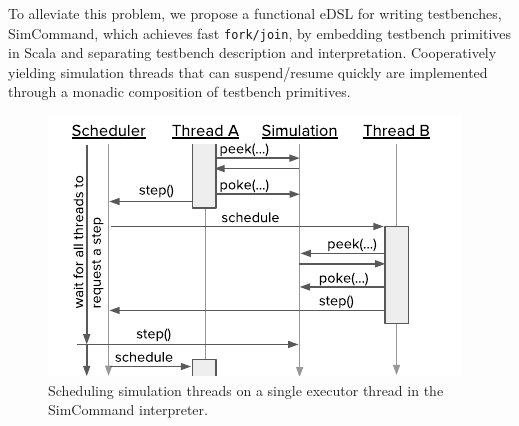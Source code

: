 \documentclass[sigplan,review,nonacm,9pt]{acmart}
\begin{document}



To alleviate this problem, we propose a functional eDSL for writing testbenches, SimCommand\cite{simcommand}, which achieves fast \texttt{fork/join}, by embedding testbench primitives in Scala and separating testbench description and interpretation.
Cooperatively yielding simulation threads that can suspend/resume quickly are implemented through a monadic composition of testbench primitives\cite{hardcaml_step_testbench}.

\begin{figure}[b]
\vspace{-3.5mm}
\includegraphics[scale=1]{simcommand/scheduler_sans_serif.pdf}
\caption{Scheduling simulation threads on a single executor thread in the SimCommand interpreter.}
\label{fig:simcommand_interp}
\end{figure}
\end{document}
